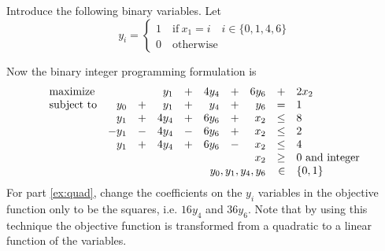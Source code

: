 \begin{enumerate}
\begin{solution} 
\bs Introduce the following binary variables. Let
\[ y_i = \begin{cases}
1 \quad \text{if}~ x_1 = i \quad i \in \{0,1,4,6\}\\
0 \quad \text{otherwise}
\end{cases}
\]

Now the binary integer programming formulation is
\[
\begin{array}{lrrrrrrrrl}
\textrm{maximize}   &&& y_1 & + & 4y_4 & + & 6y_6 & + & 2x_2 \\
\textrm{subject to} & y_0 & + & y_1 & + & y_4 & + & y_6 & = & 1 \\
& y_1 & + & 4y_4 & + & 6y_6 & + & x_2 & \leq & 8\\
& -y_1 & - & 4y_4 & - & 6y_6 & + & x_2 & \leq & 2\\
& y_1 & + & 4y_4 & + & 6y_6 & - & x_2 & \leq & 4\\
\multicolumn{8}{r}{x_2}& \geq & 0 ~\text{and integer}\\
\multicolumn{8}{r}{y_0,y_1,y_4,y_6}& \in & \{0,1\}
\end{array}
\]
For part \ref{ex:quad}, change the coefficients on the $y_i$
variables in the objective function only to be the squares,
i.e. $16y_4$ and $36y_6$. Note that by using this technique the
objective function is transformed from a quadratic to a linear function
of the variables.
\end{solution}

\begin{comment}
\item \emph{Scheduling a sports league.} An amateur hockey league is
  being formed among four cities in northern Minnesota. The cities
  with teams are Bemidji, Park Rapids, Crookston, and Detroit
  Lakes. The league is to be split into two divisions, A and B. Each
  division will have two teams. Each team is to play four away games
  against the opponent in their own league and two away games against
  opponents in the other league. We can represent this with the
  following ``away-game matrix''.

\begin{center}
\begin{tabular}{rrr}
    & A & B\\
  A & 4 & 2\\
  B & 2 & 4
\end{tabular}
\end{center}


\end{comment}
\end{enumerate}

